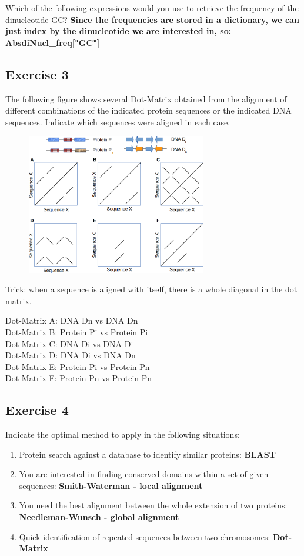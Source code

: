 Which of the following expressions would you use to retrieve the frequency of the dinucleotide GC? \textbf{Since the frequencies are stored in a dictionary, we can just index by the dinucleotide we are interested in, so: AbsdiNucl\_freq["GC"]}

\subsection{Exercise 3}
The following figure shows several Dot-Matrix obtained from the alignment of different combinations of the indicated protein sequences or the indicated DNA sequences. Indicate which sequences were aligned in each case.
\begin{figure}[htbp]
\centering
\includegraphics[width = 0.7\textwidth]{figs/exam-ex3.png}
\end{figure}

Trick: when a sequence is aligned with itself, there is a whole diagonal in the dot matrix.

\noindent
Dot-Matrix A: DNA Dn vs DNA Dn \\
Dot-Matrix B: Protein Pi vs Protein Pi \\
Dot-Matrix C: DNA Di vs DNA Di\\
Dot-Matrix D: DNA Di vs DNA Dn \\
Dot-Matrix E: Protein Pi vs Protein Pn \\
Dot-Matrix F: Protein Pn vs Protein Pn \\

\subsection{Exercise 4}
Indicate the optimal method to apply in the following situations:
\begin{enumerate}
\item Protein search against a database to identify similar proteins: \textbf{BLAST}
\item  You are interested in finding conserved domains within a set of given sequences: \textbf{Smith-Waterman - local alignment}
\item You need the best alignment between the whole extension of two proteins: \textbf{Needleman-Wunsch - global alignment}
\item Quick identification of repeated sequences between two chromosomes: \textbf{Dot-Matrix}
\end{enumerate}

